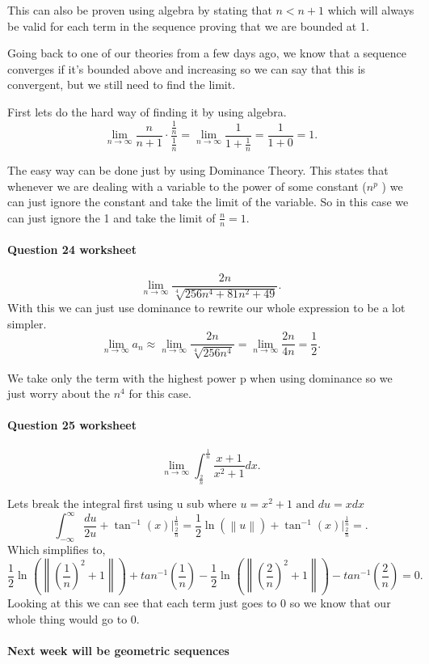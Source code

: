 This can also be proven using algebra by stating that $ n<n+1 $ which will always be valid for each term in the sequence proving that we are bounded at 1. 

Going back to one of our theories from a few days ago, we know that a sequence converges if it's bounded above and increasing so we can say that this is convergent, but we still need to find the limit.

First lets do the hard way of finding it by using algebra. 
\[
\lim_{ n \to \infty} \frac{ n }{ n+1 } \cdot \frac{ \frac{ 1 }{ n }  }{ \frac{ 1 }{ n }  }= \lim_{ n \to \infty} \frac{ 1 }{ 1+\frac{ 1 }{ n }  }= \frac{ 1 }{ 1+0 } =1
.\] 

The easy way can be done just by using Dominance Theory. This states that whenever we are dealing with a variable to the power of some constant ($ n^{ p } $ ) we can just ignore the constant and take the limit of the variable. So in this case we can just ignore the 1 and take the limit of $ \frac{ n }{ n } =1$.
\newpage
\paragraph{Question 24 worksheet}
\[
\lim_{ n \to \infty} \frac{ 2n }{ \sqrt[ 4 ]{ 256n^{ 4 }+81n^2+49 }  }
.\] 
With this we can just use dominance to rewrite our whole expression to be a lot simpler. 
\[
\lim_{ n \to \infty} a_n \approx \lim_{ n \to \infty} \frac{ 2n }{ \sqrt[ 4 ]{ 256n^{ 4 } }  } =\lim_{ n \to \infty} \frac{ 2n }{ 4n } =\frac{ 1 }{ 2 } 
.\] 

We take only the term with the highest power p when using dominance so we just worry about the $ n^{ 4 } $ for this case.

\paragraph{Question 25 worksheet}
\[
\lim_{ n \to \infty} \int_{ \frac{ 2 }{ n }  }^{ \frac{ 1 }{ n }  } \frac{ x+1 }{ x^2+1 }dx
.\] 

Lets break the integral first using u sub where $ u=x^2+1 \text{ and }du=xdx $ 
\[
\int_{ -\infty }^{ \infty } \frac{ du }{ 2u } +\tan^{-1}\left( x \right) \Big|_{ \frac{ 2 }{ n }  }^{ \frac{ 1 }{ n }  } =\frac{ 1 }{ 2 } \ln\left( \left\| u \right\| \right) +\tan^{-1}\left( x \right) \Big|_{ \frac{ 2 }{ n }  }^{ \frac{ 1 }{ n }  }=
.\] 
Which simplifies to,
\[
\frac{ 1 }{ 2 } \ln^{  } \left( \left\| \left( \frac{ 1 }{ n }  \right) ^2 +1\right\| \right) + tan^{ -1 }\left( \frac{ 1 }{ n }  \right) -\frac{ 1 }{ 2 } \ln^{  } \left( \left\| \left( \frac{ 2 }{ n }  \right) ^2 +1\right\| \right) - tan^{ -1 }\left( \frac{ 2 }{ n }  \right) =0
.\] 
Looking at this we can see that each term just goes to 0 so we know that our whole thing would go to 0. 

\paragraph{Next week will be geometric sequences}

